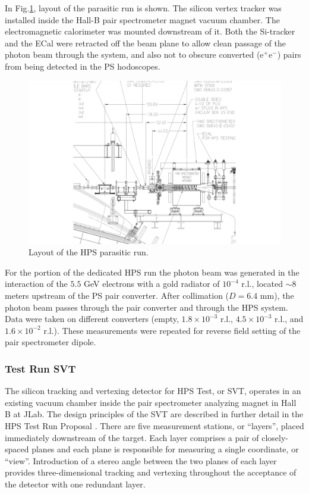 In Fig.\ref{fig:hpstest_layout}, layout of the parasitic run is shown. The silicon vertex tracker was installed inside the Hall-B pair spectrometer magnet vacuum chamber. The electromagnetic calorimeter was mounted downstream of it.
Both the Si-tracker and the ECal were retracted off the beam plane to allow clean passage of the photon beam through the system, and also not to obscure converted (e$^+$e$^-$) pairs from being detected in the PS hodoscopes.
 
\begin{figure}[ht]
    \includegraphics[width=\textwidth]{test2012/HPS_dimensions}
\caption{\small{Layout of the HPS parasitic run.} }
\label{fig:hpstest_layout}
\end{figure}

For the portion of the dedicated HPS run the photon beam was generated in the interaction of the $5.5$ GeV electrons with a gold radiator of $10^{-4}$ r.l., located $\sim 8$ meters upstream of the PS pair converter. After collimation ($D=6.4$ mm), the photon beam passes through the pair converter and through the HPS system. Data were taken on different converters (empty, $1.8\times 10^{-3}$ r.l., $4.5\times 10^{-3}$ r.l., and $1.6\times 10^{-2}$ r.l.). These measurements were repeated for reverse field setting of the pair spectrometer dipole.


\subsubsection{Test Run SVT}

The silicon tracking and vertexing detector for HPS Test, or SVT, operates in an existing vacuum chamber inside the pair spectrometer analyzing magnet in Hall B at JLab.  The design principles of the SVT are described in further detail in the HPS Test Run Proposal  \cite{HPS_tPROP}. There are five measurement stations, or ``layers'', placed immediately downstream of the target. Each layer comprises a pair of closely-spaced planes and each plane is responsible for measuring a single coordinate, or ``view''. Introduction of a stereo angle between the two planes of each layer provides three-dimensional tracking and vertexing throughout the acceptance of the detector with one redundant layer. 

